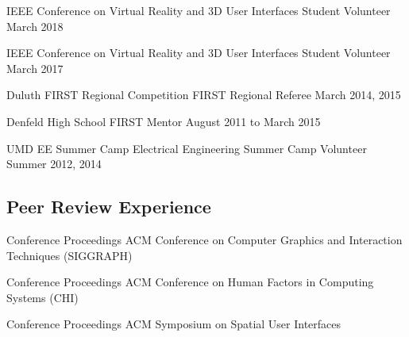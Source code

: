 \begin{cventries}
  \cventry
    {IEEE Conference on Virtual Reality and 3D User Interfaces} %
    {Student Volunteer} %
    {March 2018} %
    {} %
    {}
    \vspace{-0.15in}
    
  \cventry
    {IEEE Conference on Virtual Reality and 3D User Interfaces} %
    {Student Volunteer} %
    {March 2017} %
    {} %
    {}
    \vspace{-0.15in}
    
  \cventry
    {Duluth FIRST Regional Competition} %
    {FIRST Regional Referee} %
    {March 2014, 2015} %
    {} %
    {}
    \vspace{-0.15in}
    
  \cventry
    {Denfeld High School} %
    {FIRST Mentor} %
    {August 2011 to March 2015} %
    {} %
    {}
    \vspace{-0.15in}
    
  \cventry
    {UMD EE Summer Camp} %
    {Electrical Engineering Summer Camp Volunteer} %
    {Summer 2012, 2014} %
    {} %
    {}
    \vspace{-0.15in}
    
    

  \vspace{-.25cm}
  \subsection*{Peer Review Experience}
  
  \cventry
    {Conference Proceedings} %
    {ACM Conference on Computer Graphics and Interaction Techniques (SIGGRAPH)} %
    {} %
    {} %
    {}
    \vspace{-0.15in}
  
  \cventry
    {Conference Proceedings} %
    {ACM Conference on Human Factors in Computing Systems (CHI)} %
    {} %
    {} %
    {}
    \vspace{-0.15in}
    
  \cventry
    {Conference Proceedings} %
    {ACM Symposium on Spatial User Interfaces} %
    {} %
    {} %
    {}
    \vspace{-0.15in}
    

\end{cventries}
